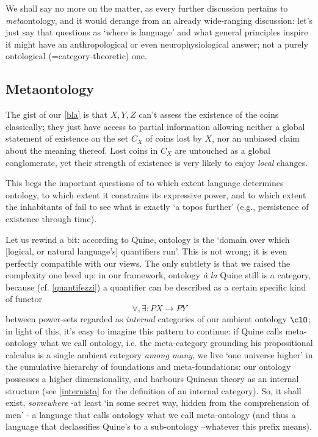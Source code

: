 We shall say no more on the matter, as every further discussion pertains to \emph{meta}ontology, and it would derange from an already wide-ranging discussion: let's just say that questions as `where is language' and what general principles inspire it might have an anthropological or even neurophysiological answer; not a purely ontological (=category-theoretic) one.

\subsection{Metaontology} \label{metaon}
The gist of our \autoref{bla} is that $X,Y,Z$ can't assess the existence of the coins classically; they just have access to partial information allowing neither a global statement of existence on the set $C_X$ of coins lost by $X$, nor an unbiased claim about the meaning thereof. Lost coins in $C_X$ are untouched as a global conglomerate, yet their strength of existence is very likely to enjoy \emph{local} changes.

This begs the important questions of to which extent language determines ontology, to which extent it constrains its expressive power, and to which extent the inhabitants of \tlon fail to see what is exactly `a topos further' (e.g., persistence of existence through time).

Let us rewind a bit: according to Quine, ontology is the `domain over which [logical, or natural language's] quantifiers run'. This is not wrong; it is even perfectly compatible with our views. The only subtlety is that we raised the complexity one level up: in our framework, ontology \emph{à la} Quine still is a category, because (cf. \autoref{quantifezzi}) a quantifier can be described as a certain specific kind of functor
\[\forall,\exists : PX \to PY\]
between power-sets regarded as \emph{internal} categories of our ambient ontology $\clO$; in light of this, it's easy to imagine this pattern to continue: if Quine calls meta-ontology what we call ontology, i.e. the meta-category grounding his propositional calculus is a single ambient category \emph{among many}, we live `one universe higher' in the cumulative hierarchy of foundations and meta-foundations: our ontology possesses a higher dimensionality, and harbours Quinean theory as an internal structure (see \autoref{internista} for the definition of an internal category). So, it shall exist, \emph{somewhere} -at least `in some secret way, hidden from the comprehension of men' \cite{Borges1963}- a language that calls ontology what we call meta-ontology (and thus a language that declassifies Quine's to a sub-ontology --whatever this prefix means).

